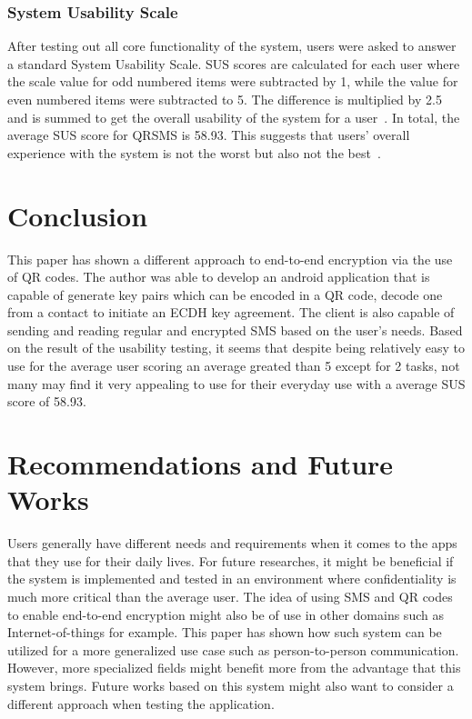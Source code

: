 \documentclass{report}
\begin{document}
\subsubsection{System Usability Scale}
After testing out all core functionality of the system, users were asked to answer a standard System Usability Scale. SUS scores are calculated for each user where the scale value for odd numbered items were subtracted by 1, while the value for even numbered items were subtracted to 5. The difference is multiplied by 2.5 and is summed to get the overall usability of the system for a user~\cite{sus_scale}. In total, the average SUS score for QRSMS is 58.93. This suggests that users' overall experience with the system is not the worst but also not the best~\cite{Bangor_2009}.

\section{Conclusion}
This paper has shown a different approach to end-to-end encryption via the use of QR codes. The author was able to develop an android application that is capable of generate key pairs which can be encoded in a QR code, decode one from a contact to initiate an ECDH key agreement. The client is also capable of sending and reading regular and encrypted SMS based on the user's needs. Based on the result of the usability testing, it seems that despite being relatively easy to use for the average user scoring an average greated than 5 except for 2 tasks, not many may find it very appealing to use for their everyday use with a average SUS score of 58.93.

\section{Recommendations and Future Works}
Users generally have different needs and requirements when it comes to the apps that they use for their daily lives. For future researches, it might be beneficial if the system is implemented and tested in an environment where confidentiality is much more critical than the average user. The idea of using SMS and QR codes to enable end-to-end encryption might also be of use in other domains such as Internet-of-things for example. This paper has shown how such system can be utilized for a more generalized use case such as person-to-person communication. However, more specialized fields might benefit more from the advantage that this system brings. Future works based on this system might also want to consider a different approach when testing the application.
\end{document}
